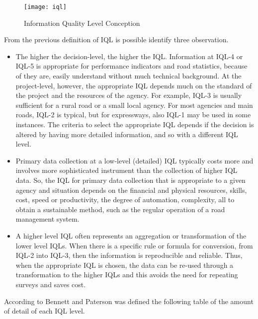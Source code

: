 \documentclass{standalone}
\begin{document}
\begin{figure}[ht]
\centering
\texttt{[image: iql]}
\caption{Information Quality Level Conception}
\label{fig:Information Quality Level Conception}
\end{figure}

\clearpage
From the previous definition of IQL is possible identify three observation.

\begin{itemize}

\item The higher the decision-level, the higher the IQL. Information at IQL-4 or IQL-5 is appropriate for performance indicators and road statistics, because of they are, easily understand without much technical background.
At the project-level, however, the appropriate IQL depends much on the standard of the project and the resources of the agency. For example, IQL-3 is usually sufficient for a rural road or a small local agency. For
most agencies and main roads, IQL-2 is typical, but for expressways, also IQL-1 may be used in some instances.
The criteria to select the appropriate IQL depends if the decision is altered by having more detailed information, and so with a different IQL level.

\item Primary data collection at a low-level (detailed) IQL typically costs more and involves more sophisticated instrument than the collection of higher IQL data. So, the IQL for primary data collection that is appropriate to a
given agency and situation depends on the financial and physical resources, skills, cost, speed or productivity, the degree of automation, complexity, all to obtain a  sustainable method, such as the regular operation of a road management system.

\item A higher level IQL often represents an aggregation or transformation of the lower level IQLs. When there is a specific rule or formula for conversion, from IQL-2 into IQL-3, then the information is reproducible and reliable. Thus, when the appropriate IQL is chosen, the
data can be re-used through a transformation to the higher IQLs and this avoids the need for repeating surveys and saves cost.


\end{itemize}
\clearpage
\noindent According to Bennett and Paterson\cite{bennett2000guide} was defined the following table of the amount of detail of each IQL level.
\end{document}
